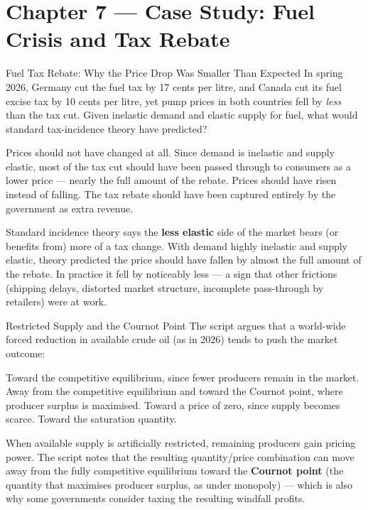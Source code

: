 \section{Chapter 7 — Case Study: Fuel Crisis and Tax Rebate}

\begin{question}[type=mc]{Fuel Tax Rebate: Why the Price Drop Was Smaller Than
  Expected}
In spring 2026, Germany cut the fuel tax by 17 cents per litre, and Canada
cut its fuel excise tax by 10 cents per litre, yet pump prices in both
countries fell by \emph{less} than the tax cut. Given inelastic demand and
elastic supply for fuel, what would standard tax-incidence theory have
predicted?
\begin{choices}
  \choice        Prices should not have changed at all.
  \correctchoice Since demand is inelastic and supply elastic, most of the
                 tax cut should have been passed through to consumers as a
                 lower price — nearly the full amount of the rebate.
  \choice        Prices should have risen instead of falling.
  \choice        The tax rebate should have been captured entirely by the
                 government as extra revenue.
\end{choices}
\begin{solution}
  Standard incidence theory says the \textbf{less elastic} side of the market
  bears (or benefits from) more of a tax change. With demand highly
  inelastic and supply elastic, theory predicted the price should have
  fallen by almost the full amount of the rebate. In practice it fell by
  noticeably less — a sign that other frictions (shipping delays, distorted
  market structure, incomplete pass-through by retailers) were at work.
\end{solution}
\end{question}

\begin{question}[type=mc]{Restricted Supply and the Cournot Point}
The script argues that a world-wide forced reduction in available crude oil
(as in 2026) tends to push the market outcome:
\begin{choices}
  \choice        Toward the competitive equilibrium, since fewer producers
                 remain in the market.
  \correctchoice Away from the competitive equilibrium and toward the Cournot
                 point, where producer surplus is maximised.
  \choice        Toward a price of zero, since supply becomes scarce.
  \choice        Toward the saturation quantity.
\end{choices}
\begin{solution}
  When available supply is artificially restricted, remaining producers gain
  pricing power. The script notes that the resulting quantity/price
  combination can move away from the fully competitive equilibrium toward
  the \textbf{Cournot point} (the quantity that maximises producer surplus,
  as under monopoly) — which is also why some governments consider taxing
  the resulting windfall profits.
\end{solution}
\end{question}

